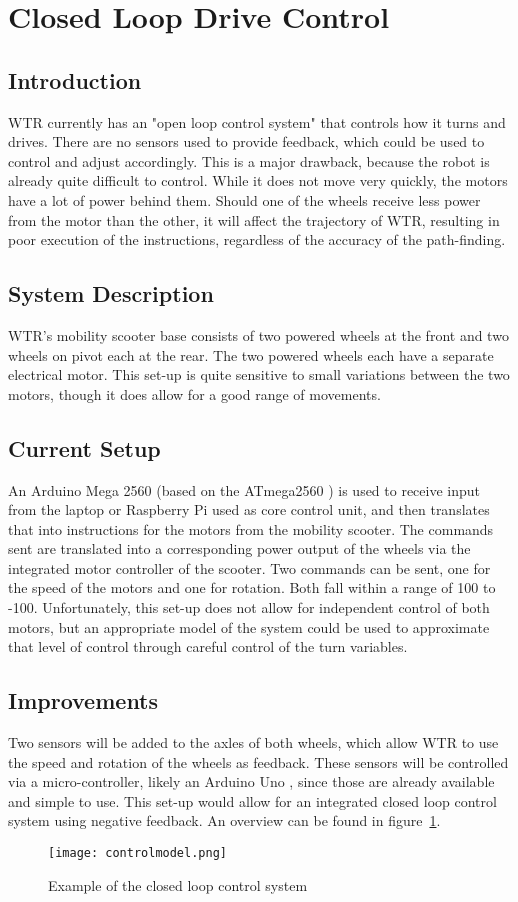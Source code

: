 \section{Closed Loop Drive Control}
\subsection{Introduction}
WTR currently has an "open loop control system" \cite{openloop} that controls how it turns and drives.
There are no sensors used to provide feedback, which could be used to control and adjust accordingly.
This is a major drawback, because the robot is already quite difficult to control.
While it does not move very quickly, the motors have a lot of power behind them.
Should one of the wheels receive less power from the motor than the other, it will affect the trajectory of WTR, resulting in poor execution of the instructions, regardless of the accuracy of the path-finding.

\subsection{System Description}
\label{subs::SysDes}
WTR's mobility scooter base consists of two powered wheels at the front and two wheels on pivot each at the rear.
The two powered wheels each have a separate electrical motor.
This set-up is quite sensitive to small variations between the two motors, though it does allow for a good range of movements.

\subsection{Current Setup}
An Arduino Mega 2560 (based on the ATmega2560 \cite{ardMega}) is used to receive input from the laptop or Raspberry Pi used as core control unit, and then translates that into instructions for the motors from the mobility scooter.
The commands sent are translated into a corresponding power output of the wheels via the integrated motor controller of the scooter.
Two commands can be sent, one for the speed of the motors and one for rotation.
Both fall within a range of 100 to -100.
Unfortunately, this set-up does not allow for independent control of both motors, but an appropriate model of the system could be used to approximate that level of control through careful control of the turn variables.

\subsection{Improvements}
Two sensors will be added to the axles of both wheels, which allow WTR to use the speed and rotation of the wheels as feedback.
These sensors will be controlled via a micro-controller, likely an Arduino Uno \cite{ardUno}, since those are already available and simple to use.
This set-up would allow for an integrated closed loop control system using negative feedback.
An overview can be found in figure~\ref{fig::cllp}.
\begin{figure}[H]
\centering
\texttt{[image: controlmodel.png]}
\caption{Example of the closed loop control system}
\label{fig::cllp}
\end{figure}
\newpage

